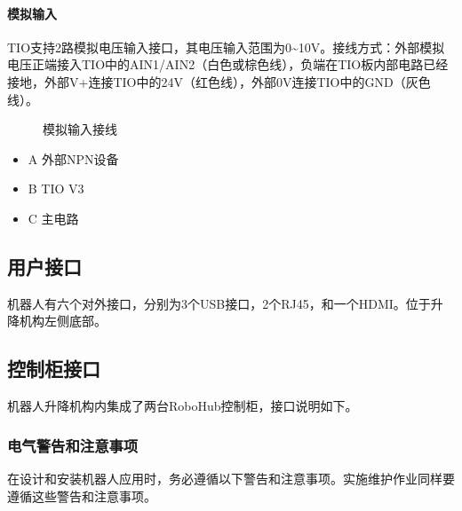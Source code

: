 \documentclass[a4paper,11pt,english,openany,oneside]{sphinxmanual}
\begin{document}
\paragraph{模拟输入}
\label{\detokenize{08 _u5b89_u88c5_u4e0e_u8c03_u8bd5:id42}}\label{\detokenize{08 _u5b89_u88c5_u4e0e_u8c03_u8bd5:id43}}
\sphinxAtStartPar
TIO支持2路模拟电压输入接口，其电压输入范围为0\textasciitilde{}10V。接线方式：外部模拟电压正端接入TIO中的AIN1/AIN2（白色或棕色线），负端在TIO板内部电路已经接地，外部V+连接TIO中的24V（红色线），外部0V连接TIO中的GND（灰色线）。

\begin{figure}[H]
\centering
\capstart

\noindent{}
\caption{模拟输入接线}\label{\detokenize{08 _u5b89_u88c5_u4e0e_u8c03_u8bd5:id105}}\end{figure}


\begin{itemize}
\item {} 
\sphinxAtStartPar
A 外部NPN设备

\item {} 
\sphinxAtStartPar
B TIO V3

\item {} 
\sphinxAtStartPar
C 主电路

\end{itemize}


\subsection{用户接口}
\label{\detokenize{08 _u5b89_u88c5_u4e0e_u8c03_u8bd5:id44}}\label{\detokenize{08 _u5b89_u88c5_u4e0e_u8c03_u8bd5:id45}}
\sphinxAtStartPar
机器人有六个对外接口，分别为3个USB接口，2个RJ45，和一个HDMI。位于升降机构左侧底部。


\subsection{控制柜接口}
\label{\detokenize{08 _u5b89_u88c5_u4e0e_u8c03_u8bd5:id46}}\label{\detokenize{08 _u5b89_u88c5_u4e0e_u8c03_u8bd5:id47}}
\sphinxAtStartPar
机器人升降机构内集成了两台RoboHub控制柜，接口说明如下。


\subsubsection{电气警告和注意事项}
\label{\detokenize{08 _u5b89_u88c5_u4e0e_u8c03_u8bd5:id48}}\label{\detokenize{08 _u5b89_u88c5_u4e0e_u8c03_u8bd5:id49}}
\sphinxAtStartPar
在设计和安装机器人应用时，务必遵循以下警告和注意事项。实施维护作业同样要遵循这些警告和注意事项。
\end{document}
